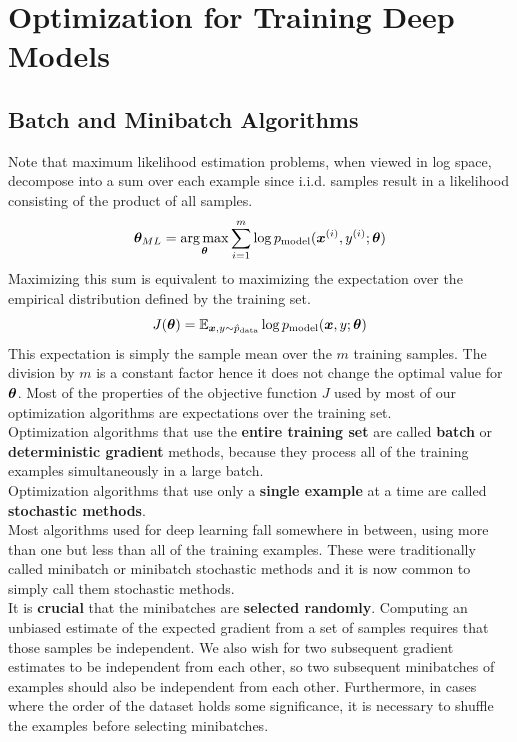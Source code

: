 \section{Optimization for Training Deep Models}
\begin{multicols}{2}
	\subsection{Batch and Minibatch Algorithms}
	Note that maximum likelihood estimation problems, when viewed in log space, decompose into a sum over each example
	since i.i.d. samples result in a likelihood consisting of the product of all samples.
	\[\bol{\theta}_{ML} = \underset{\bol{\theta}}{\arg \max} \sum_{i=1}^{m} \log p_{\text{model}} (\bol{x}^{(i)},y^{(i)};\bol{\theta}) \]
	Maximizing this sum is equivalent to maximizing the expectation over the empirical distribution defined by the training set.
	\[ J(\bolt) = \Exp_{\vx,y\sim \hat{p}_{\text{data}}} \log p_{\text{model}}(\vx,y;\bolt) \]
	This expectation is simply the sample mean over the $m$ training samples. The division by $m$ is a constant factor hence it does not change the optimal value for $\bolt$.
	Most of the properties of the objective function $J$ used by most of our optimization algorithms are expectations over the training set.\\

	Optimization algorithms that use the \textbf{entire training set} are called \textbf{batch} or \textbf{deterministic gradient} methods, because they process all of the training examples simultaneously in a large batch.\\

	Optimization algorithms that use only a \textbf{single example} at a time are called \textbf{stochastic methods}.\\

	Most algorithms used for deep learning fall somewhere in between, using more than one but less than all of the training examples.
	These were traditionally called minibatch or minibatch stochastic methods and it is now common to simply call them stochastic methods.\\

	It is \textbf{crucial} that the minibatches are \textbf{selected randomly}.
	Computing an unbiased estimate of the expected gradient from a set of samples requires that those samples be independent.
	We also wish for two subsequent gradient estimates to be independent from each other, so two subsequent minibatches of examples should also be independent from each other.
	Furthermore, in cases where the order of the dataset holds some significance, it is necessary to shuffle the examples before selecting minibatches.\\


\end{multicols}
